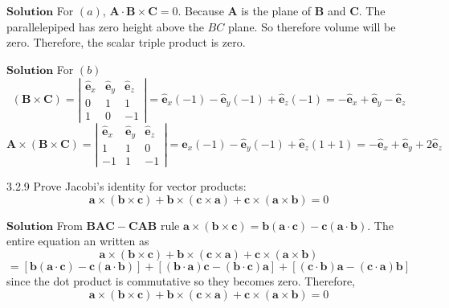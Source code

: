 \documentclass{styles/kaobook}
\begin{document}
$\boxed{\textbf{Solution}}$ For $(a)$, $\mathbf{A} \cdot \mathbf{B} \times \mathbf{C}=0 .$ Because $\mathbf{A}$ is the plane of $\mathbf{B}$ and $\mathbf{C}$. The parallelepiped has zero height above the $BC$ plane. So therefore volume will be zero.
Therefore, the scalar triple product is zero.




$\boxed{\textbf{Solution}}$ For $(b)$ 
$$
(\mathbf{B} \times \mathbf{C})=\left|\begin{array}{ccc}
\hat{\mathbf{e}}_{x} & \hat{\mathbf{e}}_{y} & \hat{\mathbf{e}}_{z} \\
0 & 1 & 1 \\
1 & 0 & -1
\end{array}\right|=\hat{\mathbf{e}}_{x}(-1)-\hat{\mathbf{e}}_{y}(-1)+\hat{\mathbf{e}}_{z}(-1)=-\hat{\mathbf{e}}_{x}+\hat{\mathbf{e}}_{y}-\hat{\mathbf{e}}_{z}
$$
$$
\mathbf{A} \times(\mathbf{B} \times \mathbf{C})=\left|\begin{array}{ccc}
\hat{\mathbf{e}}_{x} & \hat{\mathbf{e}}_{y} & \hat{\mathbf{e}}_{z} \\
1 & 1 & 0 \\
-1 & 1 & -1
\end{array}\right|=\hat{\mathbf{e}}_{x}(-1)-\hat{\mathbf{e}}_{y}(-1)+\hat{\mathbf{e}}_{z}(1+1)=-\hat{\mathbf{e}}_{x}+\hat{\mathbf{e}}_{y}+2 \hat{\mathbf{e}}_{z}
$$




\begin{greenbox}{3.2.9}
Prove Jacobi's identity for vector products:
$$
\mathbf{a} \times(\mathbf{b} \times \mathbf{c})+\mathbf{b} \times(\mathbf{c} \times \mathbf{a})+\mathbf{c} \times(\mathbf{a} \times \mathbf{b})=0
$$
\end{greenbox}


$\boxed{\textbf{Solution}}$ From $\mathbf{BA}\mathbf{C}-\mathbf{C}\mathbf{AB}$ rule $\mathbf{a}\times(\mathbf{b} \times \mathbf{c})=\mathbf{b}(\mathbf{a}\cdot \mathbf{c})-\mathbf{c}(\mathbf{a} \cdot \mathbf{b}).$ The entire equation an written as
$$
\mathbf{a}\times(\mathbf{b} \times \mathbf{c})+\mathbf{b} \times(\mathbf{c} \times \mathbf{a})+\mathbf{c} \times(\mathbf{a} \times \mathbf{b})$$
$$=[\mathbf{b}(\mathbf{a} \cdot \mathbf{c})-\mathbf{c}(\mathbf{a} \cdot \mathbf{b})]+[(\mathbf{b} \cdot \mathbf{a}) \mathbf{c}-(\mathbf{b} \cdot \mathbf{c}) \mathbf{a}]+[(\mathbf{c} \cdot \mathbf{b}) \mathbf{a}-(\mathbf{c} \cdot \mathbf{a}) \mathbf{b}]
$$
since the dot product is commutative so they becomes zero.
Therefore, $$ \mathbf{a}\times(\mathbf{b} \times \mathbf{c})+\mathbf{b} \times(\mathbf{c} \times \mathbf{a})+\mathbf{c} \times(\mathbf{a} \times \mathbf{b})=0$$
\end{document}
